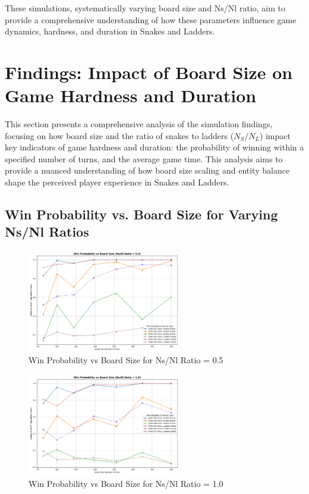 These simulations, systematically varying board size and Ns/Nl ratio, aim to provide a comprehensive understanding of how these parameters influence game dynamics, hardness, and duration in Snakes and Ladders.

\section{Findings: Impact of Board Size on Game Hardness and Duration}

This section presents a comprehensive analysis of the simulation findings, focusing on how board size and the ratio of snakes to ladders ($N_S/N_L$) impact key indicators of game hardness and duration: the probability of winning within a specified number of turns, and the average game time.  This analysis aims to provide a nuanced understanding of how board size scaling and entity balance shape the perceived player experience in Snakes and Ladders.

\subsection{Win Probability vs. Board Size for Varying Ns/Nl Ratios}

\begin{figure}[th]
	\centering
	\includegraphics[width=0.6\textwidth]{"../Chapter 4/Latest/plots_output/WinProbVsBoardSize_ByRatio/WinProbVsBoardSize_ByRatio_ns_nl_ratio-0_5"}
	\caption{Win Probability vs Board Size for Ns/Nl Ratio = 0.5}
	\label{fig:winprob_vs_boardsize_ratio_0_5}
\end{figure}

\begin{figure}[th]
	\centering
	\includegraphics[width=0.6\textwidth]{"../Chapter 4/Latest/plots_output/WinProbVsBoardSize_ByRatio/WinProbVsBoardSize_ByRatio_ns_nl_ratio-1_0"}
	\caption{Win Probability vs Board Size for Ns/Nl Ratio = 1.0}
	\label{fig:winprob_vs_boardsize_ratio_1_0}
\end{figure}


